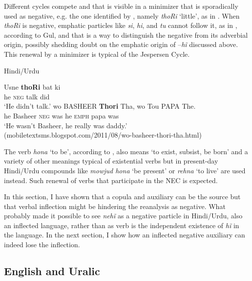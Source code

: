 ﻿\documentclass[output=paper]{langsci/langscibook}
\begin{document}
Different cycles compete and that is visible in a minimizer that is
sporadically used as negative, e.g. the one identified by \citet{Gul2009},
namely \textit{thoRi} `little', as in . When \textit{thoRi}
is negative, emphatic particles like \textit{si}, \textit{hi}, and
\textit{tu} cannot follow it, as in , according to Gul, and
that is a way to distinguish the negative from its adverbial origin,
possibly shedding doubt on the emphatic origin of –\textit{hĩ} discussed
above. This renewal by a minimizer is typical of the Jespersen Cycle.
\begin{exe}\ex Hindi\slash Urdu \label{ex:other-hindi-talk-Basheer}\begin{xlist}
    \ex  \label{ex:other-hindi-talk}
    \gll Usne \textbf{thoRi} bat ki \\
    he  \textsc{neg}  talk  did \\
    \glt `He didn't talk.’ \citep{Gul2009}
    \ex \label{ex:other-hindi-Basheer}
    \gll wo BASHEER \textbf{Thori} Tha, wo Tou PAPA The.  \\
    he  Basheer  \textsc{neg}  was  he  \textsc{emph}  papa  was\\
    \glt `He wasn't Basheer, he really was daddy.’ 
(mobiletextsms.blogspot.com/2011/08/wo-basheer-thori-tha.html)
    \end{xlist}\end{exe}
%
The verb \textit{hona} `to be', according to \citet{Platts1884}, also means
`to exist, subsist, be born' and a variety of other meanings typical of
existential verbs but in present-day Hindi\slash Urdu compounds like
\textit{mowjud hona} `be present' or \textit{rehna} `to live' are used
instead. Such renewal of verbs that participate in the NEC is expected.

In this section, I have shown that a copula and auxiliary can be the source
but that verbal inflection might be hindering the reanalysis as negative.
What probably made it possible to see \textit{nehĩ} as a negative
particle in Hindi\slash Urdu, also an inflected language, rather than as
verb is the independent existence of \textit{hĩ} in the language. In the
next section, I show how an inflected negative auxiliary can indeed lose
the inflection.

\subsection{English and Uralic}\label{sec:oth-2.2}
\end{document}

